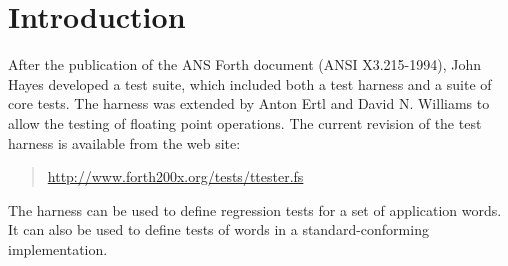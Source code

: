 
\label{annex:test}

\section{Introduction} %
\label{test:intro}

After the publication of the ANS Forth document
(ANSI X3.215-1994), John Hayes developed a test suite, which
included both a test harness and a suite of core tests.  The
harness was extended by Anton Ertl and David N. Williams to
allow the testing of floating point operations.
The current revision of the test harness is available from the
web site:

\begin{quote}
	\url{http://www.forth200x.org/tests/ttester.fs}
\end{quote}



The  harness can be used to define regression tests for a set of
application words.  It can also be used to define tests of words in
a standard-conforming implementation.


